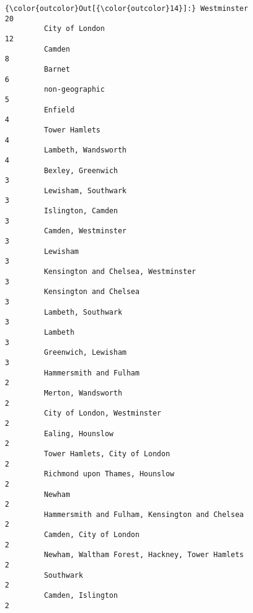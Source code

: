 \documentclass[11pt]{article}
\begin{document}
\begin{Verbatim}[commandchars=\\\{\}]
{\color{outcolor}Out[{\color{outcolor}14}]:} Westminster                                                           20
         City of London                                                        12
         Camden                                                                 8
         Barnet                                                                 6
         non-geographic                                                         5
         Enfield                                                                4
         Tower Hamlets                                                          4
         Lambeth, Wandsworth                                                    4
         Bexley, Greenwich                                                      3
         Lewisham, Southwark                                                    3
         Islington, Camden                                                      3
         Camden, Westminster                                                    3
         Lewisham                                                               3
         Kensington and Chelsea, Westminster                                    3
         Kensington and Chelsea                                                 3
         Lambeth, Southwark                                                     3
         Lambeth                                                                3
         Greenwich, Lewisham                                                    3
         Hammersmith and Fulham                                                 2
         Merton, Wandsworth                                                     2
         City of London, Westminster                                            2
         Ealing, Hounslow                                                       2
         Tower Hamlets, City of London                                          2
         Richmond upon Thames, Hounslow                                         2
         Newham                                                                 2
         Hammersmith and Fulham, Kensington and Chelsea                         2
         Camden, City of London                                                 2
         Newham, Waltham Forest, Hackney, Tower Hamlets                         2
         Southwark                                                              2
         Camden, Islington                                                      2

\end{Verbatim}
\end{document}
